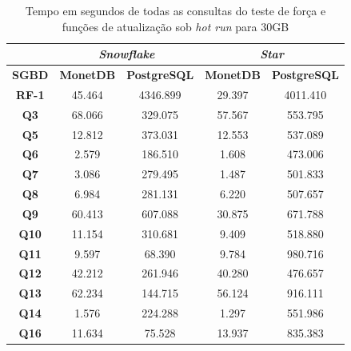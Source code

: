 \begin{table}[t]
        \centering
        \caption{Tempo em segundos de todas as consultas do teste de força e funções de atualização sob \textit{hot run} para 30GB}
        \label{tab:queries_hot_30}
        \begin{tabular}{|c|c|c|c|c|}
        \hline
                & \multicolumn{2}{c|}{\textit{\textbf{Snowflake}}} & \multicolumn{2}{c|}{\textit{\textbf{Star}}} \\ \hline
        \textbf{SGBD}  & \textbf{MonetDB}      & \textbf{PostgreSQL}      & \textbf{MonetDB}    & \textbf{PostgreSQL}   \\ \hline
        \textbf{RF-1}  & 45.464            & 4346.899            & 29.397           & 4011.410            \\ \hline
        \textbf{Q3}    & 68.066            & 329.075             & 57.567           & 553.795             \\ \hline
        \textbf{Q5}    & 12.812            & 373.031             & 12.553           & 537.089             \\ \hline
        \textbf{Q6}    & 2.579             & 186.510             & 1.608            & 473.006             \\ \hline
        \textbf{Q7}    & 3.086             & 279.495             & 1.487            & 501.833             \\ \hline
        \textbf{Q8}    & 6.984             & 281.131             & 6.220            & 507.657             \\ \hline
        \textbf{Q9}    & 60.413            & 607.088             & 30.875           & 671.788             \\ \hline
        \textbf{Q10}   & 11.154            & 310.681             & 9.409            & 518.880             \\ \hline
        \textbf{Q11}   & 9.597             & 68.390              & 9.784            & 980.716             \\ \hline
        \textbf{Q12}   & 42.212            & 261.946             & 40.280           & 476.657             \\ \hline
        \textbf{Q13}   & 62.234            & 144.715             & 56.124           & 916.111             \\ \hline
        \textbf{Q14}   & 1.576             & 224.288             & 1.297            & 551.986             \\ \hline
        \textbf{Q16}   & 11.634            & 75.528              & 13.937           & 835.383             \\ \hline

\end{tabular}
\end{table}
